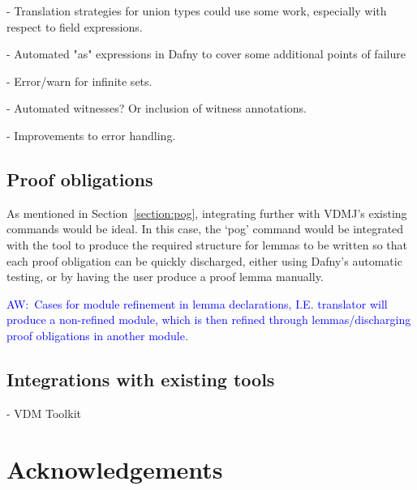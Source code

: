 \documentclass{entcs}
\newcommand{\awcomment}[1]{\ifthenelse { \boolean{showComments} } {\textcolor{blue}{AW:~#1}} { } } %
\begin{document}
- Translation strategies for union types could use some work, especially with respect to field expressions.

- Automated "as" expressions in Dafny to cover some additional points of failure

- Error/warn for infinite sets.

- Automated witnesses? Or inclusion of witness annotations.

- Improvements to error handling.

\subsection{Proof obligations}\label{section:pog_implementations}

As mentioned in Section~\ref{section:pog}, integrating further with VDMJ's existing commands would be ideal. In this case, the `pog' command would be integrated with the tool to produce the required structure for lemmas to be written so that each proof obligation can be quickly discharged, either using Dafny's automatic testing, or by having the user produce a proof lemma manually.

\awcomment{Cases for module refinement in lemma declarations, I.E. translator will produce a non-refined module, which is then refined through lemmas/discharging proof obligations in another module.}

\subsection{Integrations with existing tools}

- VDM Toolkit

\section{Acknowledgements}



\end{document}
